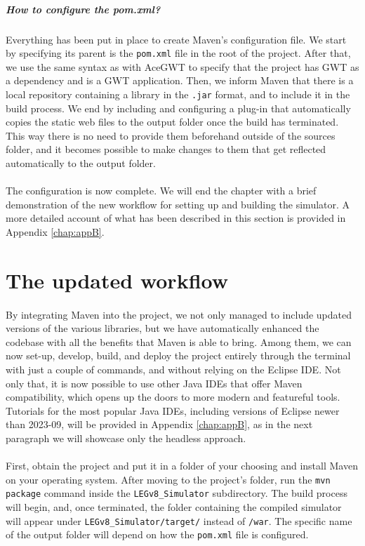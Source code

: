 \subparagraph{How to configure the pom.xml?}
Everything has been put in place to create Maven's configuration file. We start by specifying its parent is the \verb|pom.xml| file in the root of the project. After that, we use the same syntax as with AceGWT to specify that the project has GWT as a dependency and is a GWT application.  Then, we inform Maven that there is a local repository containing a library in the \verb|.jar| format, and to include it in the build process. We end by including and configuring a plug-in that automatically copies the static web files to the output folder once the build has terminated. This way there is no need to provide them beforehand outside of the sources folder, and it becomes possible to make changes to them that get reflected automatically to the output folder.
\paragraph{}
The configuration is now complete. We will end the chapter with a brief demonstration of the new workflow for setting up and building the simulator. A more detailed account of what has been described in this section is provided in Appendix \ref{chap:appB}.
\section{The updated workflow}
\paragraph{}
By integrating Maven into the project, we not only managed to include updated versions of the various libraries, but we have automatically enhanced the codebase with all the benefits that Maven is able to bring. Among them, we can now set-up, develop, build, and deploy the project entirely through the terminal with just a couple of commands, and without relying on the Eclipse IDE. Not only that, it is now possible to use other Java IDEs that offer Maven compatibility, which opens up the doors to more modern and featureful tools. Tutorials for the most popular Java IDEs, including versions of Eclipse newer than 2023-09, will be provided in Appendix \ref{chap:appB}, as in the next paragraph we will showcase only the headless approach.
\paragraph{}
First, obtain the project and put it in a folder of your choosing and install Maven on your operating system. After moving to the project's folder, run the \verb|mvn package| command inside the \verb|LEGv8_Simulator| subdirectory. The build process will begin, and, once terminated, the folder containing the compiled simulator will appear under \verb|LEGv8_Simulator/target/| instead of \verb|/war|. The specific name of the output folder will depend on how the \verb|pom.xml| file is configured.

